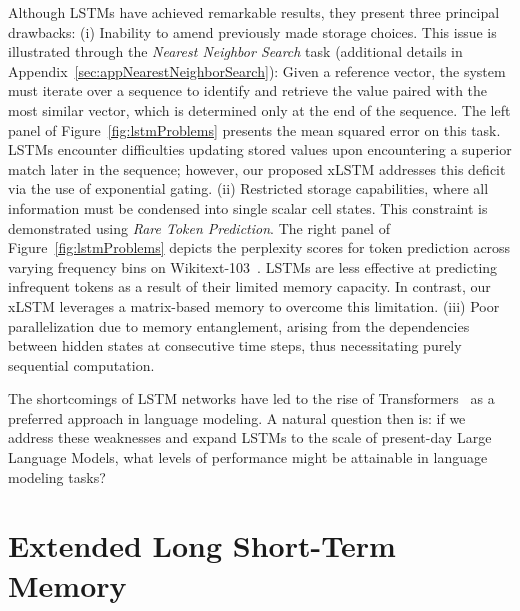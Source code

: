 Although LSTMs have achieved remarkable results, they present three principal drawbacks: (i) Inability to amend previously made storage choices. This issue is illustrated through the 
{\it Nearest Neighbor Search} task (additional details in Appendix~\ref{sec:appNearestNeighborSearch}): 
Given a reference vector, the system must iterate over a sequence to identify and retrieve the value paired with the most similar vector, which is determined only at the end of the sequence. The left panel of Figure~\ref{fig:lstmProblems} presents the mean squared error on this task. LSTMs encounter difficulties updating stored values upon encountering a superior match later in the sequence; however, our proposed xLSTM addresses this deficit via the use of exponential gating. (ii) Restricted storage capabilities, where all information must be condensed into single scalar cell states. This constraint is demonstrated using {\it Rare Token Prediction}. The right panel of Figure~\ref{fig:lstmProblems} depicts the perplexity scores for token prediction across varying frequency bins on Wikitext-103~\citep{Merity:17}. LSTMs are less effective at predicting infrequent tokens as a result of their limited memory capacity. In contrast, our xLSTM leverages a matrix-based memory to overcome this limitation. (iii) Poor parallelization due to memory entanglement, arising from the dependencies between hidden states at consecutive time steps, thus necessitating purely sequential computation.

The shortcomings of LSTM networks have led to the rise of Transformers~\citep{Vaswani:17} as a preferred approach in language modeling. A natural question then is: if we address these weaknesses and expand LSTMs to the scale of present-day Large Language Models, what levels of performance might be attainable in language modeling tasks?

\section{Extended Long Short-Term Memory}
\label{sec:xLSTM}

